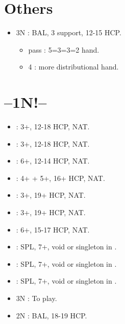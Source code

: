 \documentclass[12pt,twoside,a5paper]{report}%
\begin{document}
	\section*{Others}
	\begin{itemize}
	\renewcommand{\labelitemi}{}
	\item 3N : BAL, 3\he{} support, 12-15 HCP.
		\begin{itemize}
		\renewcommand{\labelitemi}{--}
		\item pass : 5=3=3=2 hand.
		\item 4\he{} : more distributional hand.
		\end{itemize}
	\end{itemize}
	
	\section*{--1N!--}
	\begin{itemize}
	\renewcommand{\labelitemi}{}
	\item {} : 3+\cl{}, 12-18 HCP, NAT.
	\item {} : 3+\di{}, 12-18 HCP, NAT.
	\item {} : 6+\he{}, 12-14 HCP, NAT.
	\item {} : 4+\sp{} + 5+\he{}, 16+ HCP, NAT.
	\item {} : 3+\cl{}, 19+ HCP, NAT.
	\item {} : 3+\di{}, 19+ HCP, NAT.
	\item {} : 6+\he{}, 15-17 HCP, NAT.
	\item {} : SPL, 7+\he{}, void or singleton in \sp{}. 
	\item {} : SPL, 7+\he{}, void or singleton in \cl{}.
	\item {} : SPL, 7+\he{}, void or singleton in \di{}.
	\item 3N : To play.
	\item 2N : BAL, 18-19 HCP.
	\end{itemize}
\end{document}
